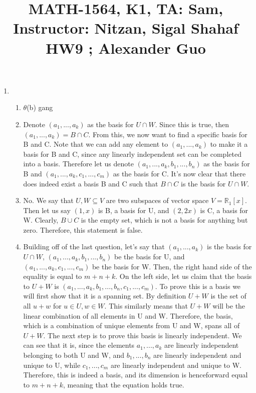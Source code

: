 \documentclass{article}
\title{\large{\vspace{-1.0cm}MATH-1564, K1, TA: Sam, Instructor: Nitzan, Sigal Shahaf \\ HW9 ; Alexander Guo}}
\date{}
\begin{document}
\maketitle

\vspace{-1.5cm}
\large

\begin{enumerate}

\item

\begin{enumerate}

\item \textbf{$\theta$}(b) \small{gang}

\item Denote $(a_1,...,a_k)$ as the basis for $U \cap W$. Since this is true, then $(a_1,...,a_k) = B \cap C$. From this, we now want to find a specific basis for B and C. Note that we can add any element to $(a_1,...,a_k)$ to make it a basis for B and C, since any linearly independent set can be completed into a basis. Therefore let us denote $(a_1,...,a_k,b_1,...,b_n)$ as the basis for B and $(a_1,...,a_k,c_1,...,c_m)$ as the basis for C. It's now clear that there does indeed exist a basis B and C such that $B \cap C$ is the basis for $U \cap W$.

\item No. We say that $U,W \subseteq V$ are two subspaces of vector space $V = \mathbb{R}_1[x]$. Then let us say $(1,x)$ is B, a basis for U, and $(2,2x)$ is C, a basis for W. Clearly, $B \cup C$ is the empty set, which is not a basis for anything but zero. Therefore, this statement is false.

\item Building off of the last question, let's say that $(a_1,...,a_k)$ is the basis for $U \cap W$, $(a_1,...,a_k,b_1,...,b_n)$ be the basis for U, and $(a_1,...,a_k,c_1,...,c_m)$ be the basis for W. Then, the right hand side of the equality is equal to $m+n+k$. On the left side, let us claim that the basis to $U+W$ is $(a_1,...,a_k,b_1,...,b_n,c_1,...,c_m)$. To prove this is a basis we will first show that it is a spanning set. By definition $U+W$ is the set of all $u+w$ for $u \in U, w \in W$. This similarly means that $U+W$ will be the linear combination of all elements in U and W. Therefore, the basis, which is a combination of unique elements from U and W, spans all of $U+W$. The next step is to prove this basis is linearly independent. We can see that it is, since the elements $a_1,...,a_k$ are linearly independent belonging to both U and W, and $b_1,...,b_n$ are linearly independent and unique to U, while $c_1,...,c_m$ are linearly independent and unique to W. Therefore, this is indeed a basis, and its dimension is henceforward equal to $m + n + k$, meaning that the equation holds true.


\end{enumerate}
\end{enumerate}
\end{document}
